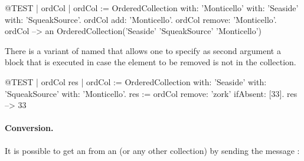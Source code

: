 \documentclass[a4paper,10pt,twoside]{book}
\begin{document}
\begin{code}{@TEST | ordCol | ordCol := OrderedCollection with: 'Monticello' with: 'Seaside' with: 'SqueakSource'.}
ordCol add: 'Monticello'.
ordCol remove: 'Monticello'.
ordCol --> an OrderedCollection('Seaside' 'SqueakSource' 'Monticello')
\end{code}

There is a variant of  named  that allows one to specify as second argument a block that is executed in case the element to be removed is not in the collection. 

\begin{code}{@TEST | ordCol res | ordCol := OrderedCollection with: 'Seaside' with: 'SqueakSource' with: 'Monticello'.}
res := ordCol remove: 'zork' ifAbsent: [33].
res --> 33
\end{code}

\paragraph{Conversion.}
It is possible to get an  from an  (or any other collection) by sending the message :




\end{document}
